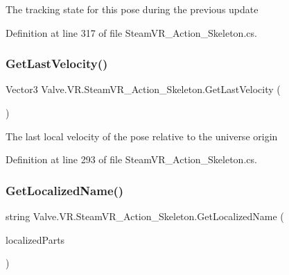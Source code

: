 The tracking state for this pose during the previous update 



Definition at line 317 of file Steam\+V\+R\+\_\+\+Action\+\_\+\+Skeleton.\+cs.

\mbox{\label{class_valve_1_1_v_r_1_1_steam_v_r___action___skeleton_afb56cc4c7eee341e315587c4407472b3}} 
\subsubsection{\texorpdfstring{GetLastVelocity()}{GetLastVelocity()}}
{\footnotesize\ttfamily Vector3 Valve.\+V\+R.\+Steam\+V\+R\+\_\+\+Action\+\_\+\+Skeleton.\+Get\+Last\+Velocity (\begin{DoxyParamCaption}{ }\end{DoxyParamCaption})}



The last local velocity of the pose relative to the universe origin 



Definition at line 293 of file Steam\+V\+R\+\_\+\+Action\+\_\+\+Skeleton.\+cs.

\mbox{\label{class_valve_1_1_v_r_1_1_steam_v_r___action___skeleton_a398ec0f09d88b3047166425dcf8cb33c}} 
\subsubsection{\texorpdfstring{GetLocalizedName()}{GetLocalizedName()}}
{\footnotesize\ttfamily string Valve.\+V\+R.\+Steam\+V\+R\+\_\+\+Action\+\_\+\+Skeleton.\+Get\+Localized\+Name (\begin{DoxyParamCaption}\item[{params \mbox{\hyperlink{namespace_valve_1_1_v_r_a05e76187bbc5846b9bfb44f6acf13912}{E\+V\+R\+Input\+String\+Bits}} \mbox{[}$\,$\mbox{]}}]{localized\+Parts }\end{DoxyParamCaption})}



